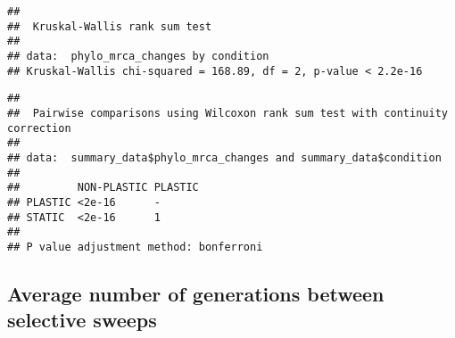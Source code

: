 \documentclass[]{book}
\newenvironment{Shaded}{\begin{snugshade}}{\end{snugshade}}
\newcommand{\DataTypeTok}[1]{\textcolor[rgb]{0.13,0.29,0.53}{#1}}
\newcommand{\KeywordTok}[1]{\textcolor[rgb]{0.13,0.29,0.53}{\textbf{#1}}}
\newcommand{\NormalTok}[1]{#1}
\newcommand{\OperatorTok}[1]{\textcolor[rgb]{0.81,0.36,0.00}{\textbf{#1}}}
\newcommand{\StringTok}[1]{\textcolor[rgb]{0.31,0.60,0.02}{#1}}
\begin{document}
\begin{verbatim}
## 
##  Kruskal-Wallis rank sum test
## 
## data:  phylo_mrca_changes by condition
## Kruskal-Wallis chi-squared = 168.89, df = 2, p-value < 2.2e-16
\end{verbatim}

\begin{Shaded}
\end{Shaded}

\begin{verbatim}
## 
##  Pairwise comparisons using Wilcoxon rank sum test with continuity correction 
## 
## data:  summary_data$phylo_mrca_changes and summary_data$condition 
## 
##         NON-PLASTIC PLASTIC
## PLASTIC <2e-16      -      
## STATIC  <2e-16      1      
## 
## P value adjustment method: bonferroni
\end{verbatim}

\hypertarget{average-number-of-generations-between-selective-sweeps}{%
\subsection{Average number of generations between selective sweeps}\label{average-number-of-generations-between-selective-sweeps}}
\end{document}
